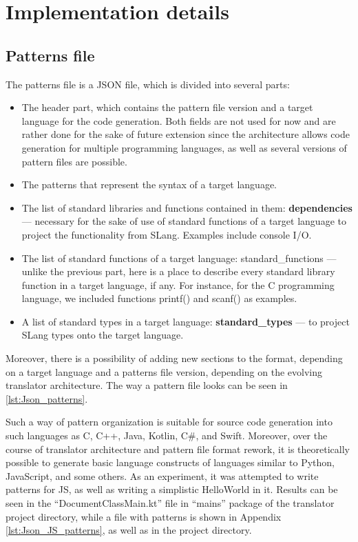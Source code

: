 \section{Implementation details}

\subsection{Patterns file}
The patterns file is a JSON file, which is divided into several parts:
\begin{itemize}
    \item The header part, which contains the pattern file version and a target language for the code generation. Both fields are not used for now and are rather done for the sake of future extension since the architecture allows code generation for multiple programming languages, as well as several versions of pattern files are possible.
    \item The patterns that represent the syntax of a target language.
    \item The list of standard libraries and functions contained in them: \textbf{dependencies} --- necessary for the sake of use of standard functions of a target language to project the functionality from SLang. Examples include console I/O.
    \item The list of standard functions of a target language: {standard\_functions} --- unlike the previous part, here is a place to describe every standard library function in a target language, if any. For instance, for the C programming language, we included functions printf() and scanf() as examples.
    \item A list of standard types in a target language: \textbf{standard\_types} --- to project SLang types onto the target language.
\end{itemize}

Moreover, there is a possibility of adding new sections to the format, depending on a target language and a patterns file version, depending on the evolving translator architecture. The way a pattern file looks can be seen in \ref{lst:Json_patterns}.

Such a way of pattern organization is suitable for source code generation into such languages as C, C++, Java, Kotlin, C\#, and Swift.
Moreover, over the course of translator architecture and pattern file format rework, it is theoretically possible to generate basic language constructs of languages similar to Python, JavaScript, and some others.
As an experiment, it was attempted to write patterns for JS, as well as writing a simplistic HelloWorld in it.
Results can be seen in the ``DocumentClassMain.kt'' file in ``mains'' package of the translator project directory, while a file with patterns is shown in Appendix \ref{lst:Json_JS_patterns}, as well as in the project directory.


